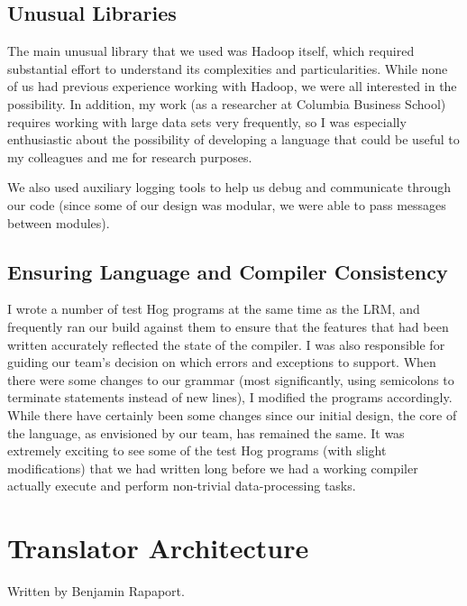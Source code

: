\documentclass{report}
\begin{document}
\section{Unusual Libraries}

The main unusual library that we used was Hadoop itself, which required substantial effort to understand its complexities and particularities. While none of us had previous experience working with Hadoop, we were all interested in the possibility. In addition, my work (as a researcher at Columbia Business School) requires working with large data sets very frequently, so I was especially enthusiastic about the possibility of developing a language that could be useful to my colleagues and me for research purposes.

We also used auxiliary logging tools to help us debug and communicate through our code (since some of our design was modular, we were able to pass messages between modules).

\section{Ensuring Language and Compiler Consistency}

I wrote a number of test Hog programs at the same time as the LRM, and frequently ran our build against them to ensure that the features that had been written accurately reflected the state of the compiler. I was also responsible for guiding our team's decision on which errors and exceptions to support. When there were some changes to our grammar (most significantly, using semicolons to terminate statements instead of new lines), I modified the programs accordingly. While there have certainly been some changes since our initial design, the core of the language, as envisioned by our team, has remained the same. It was extremely exciting to see some of the test Hog programs (with slight modifications) that we had written long before we had a working compiler actually execute and perform non-trivial data-processing tasks. 

\chapter{Translator Architecture}\label{chap:trans}

Written by Benjamin Rapaport.
\end{document}

